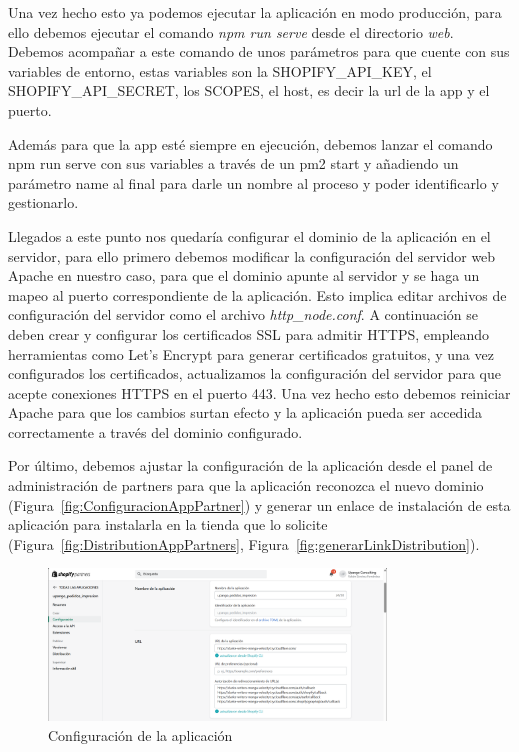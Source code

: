\documentclass[12pt]{article}
\begin{document}
Una vez hecho esto ya podemos ejecutar la aplicación en modo producción, para ello debemos ejecutar el comando \textit{npm run serve} desde el directorio \textit{web}. Debemos acompañar
a este comando de unos parámetros para que cuente con sus variables de entorno, estas variables son la SHOPIFY\_API\_KEY, el SHOPIFY\_API\_SECRET, los SCOPES,  el host, es decir la url de la app y el puerto.

Además para que la app esté siempre en ejecución, debemos lanzar el comando npm run serve con sus variables a través de un pm2 start y añadiendo un parámetro name al final para
darle un nombre al proceso y poder identificarlo y gestionarlo. 

Llegados a este punto nos quedaría configurar el dominio de la aplicación en el servidor, para ello primero debemos modificar la configuración del servidor web Apache en nuestro caso, para que 
el dominio apunte al servidor y se haga un mapeo al puerto correspondiente de la aplicación. Esto implica editar archivos de configuración del servidor como el archivo \textit{http\_node.conf}. 
A continuación se deben crear y configurar los certificados SSL para admitir HTTPS, empleando herramientas como Let's Encrypt para generar certificados gratuitos, y una vez configurados los
certificados, actualizamos la configuración del servidor para que acepte conexiones HTTPS en el puerto 443. Una vez hecho esto debemos reiniciar Apache para que los cambios surtan
efecto y la aplicación pueda ser accedida correctamente a través del dominio configurado.

Por último, debemos ajustar la configuración de la aplicación desde el panel de administración de partners para que la aplicación reconozca el nuevo dominio (Figura~\ref{fig:ConfiguracionAppPartner}) y generar un enlace de instalación de esta aplicación
para instalarla en la tienda que lo solicite (Figura~\ref{fig:DistributionAppPartners}, Figura~\ref{fig:generarLinkDistribution}).

\begin{figure}[ht]
    \centering
    \includegraphics[width=0.8\textwidth]{imagenes/panelPartnersDistribution.png}
    \caption{\label{fig:ConfiguracionAppPartners}Configuración de la aplicación}
    \vspace{\fill}
\end{figure}
\end{document}
